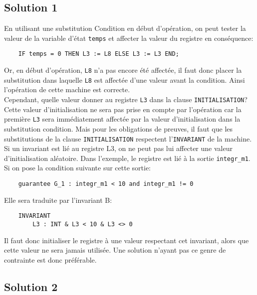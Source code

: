 \documentclass{cercles2}
\begin{document}

\subsection{Solution 1}

En utilisant une substitution \textsf{Condition} en début d'opération,
on peut tester la valeur de la variable d'état \texttt{temps} et
affecter la valeur du registre en conséquence:\\
\begin{verbatim}
    IF temps = 0 THEN L3 := L8 ELSE L3 := L3 END;
\end{verbatim}
Or, en début d'opération, \texttt{L8} n'a pas encore été affectée, il
faut donc placer la substitution dans laquelle \texttt{L8} est
affectée d'une valeur avant la condition. Ainsi l'opération de cette
machine est correcte. \\

Cependant, quelle valeur donner au registre \texttt{L3} dans la clause
\texttt{INITIALISATION}? Cette valeur d'initialisation ne sera pas
prise en compte par l'opération car la première \texttt{L3} sera
immédiatement affectée par la valeur d'initialisation dans la
substitution \textsf{condition}. Mais pour les obligations de preuves,
il faut que les substitutions de la clause \texttt{INITIALISATION}
respectent l'\texttt{INVARIANT} de la machine. Si un invariant est lié au registre L3, 
on ne peut pas lui affecter une valeur d'initialisation
aléatoire.
Dans l'exemple, le registre est lié à la sortie
\texttt{integr\_m1}. Si on pose la condition suivante sur cette sortie:
\begin{verbatim}
    guarantee G_1 : integr_m1 < 10 and integr_m1 != 0 
\end{verbatim}
Elle sera traduite par l'invariant B:
\begin{verbatim}
    INVARIANT 
        L3 : INT & L3 < 10 & L3 <> 0 
\end{verbatim}
Il faut donc initialiser le registre à une valeur respectant cet
invariant, alors que cette valeur ne sera jamais utilisée.
Une solution n'ayant pas ce genre de contrainte est donc préférable.



\subsection{Solution 2}
\end{document}
